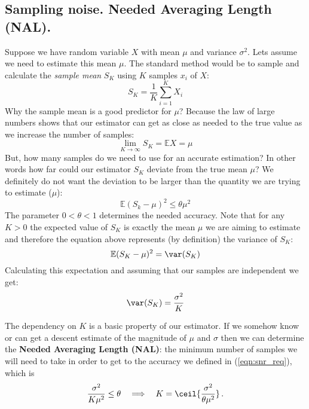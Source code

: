 \documentclass{article} %
\begin{document}
\subsection{Sampling noise. Needed Averaging Length (NAL).}
\label{sec:sampleing_noise}
Suppose we have random variable $X$ with mean $\mu$ and variance $\sigma^2$. 
Lets assume we need to estimate this mean $\mu$. The standard method would be to sample and calculate the {\it sample mean} $S_K$ using $K$ samples $x_i$ of $X$:
\begin{equation}
S_K = \frac{1}{K}\sum_{i=1}^K X_i
\label{eqn:estimate}
\end{equation}
Why the sample mean is a good predictor for $\mu$? Because the law of large numbers shows that  our estimator can get as close as needed to the true value as we increase the number of samples:
\begin{equation}
\lim_{K \rightarrow \infty} S_K = \mathbb{E} X = \mu
\end{equation}
But, how many samples do we need to use for an accurate estimation?  In other words how far could our estimator $S_K$ deviate from the true mean $\mu$? We definitely do not want the deviation to be larger than the quantity we are trying to estimate ($\mu$): 
\begin{equation}
\mathbb{E}(S_k - \mu)^2 \le \theta \mu^2
\label{eqn:snr_req}
\end{equation}
The parameter $0 < \theta < 1$ determines the needed accuracy. Note that for any $K>0$ the expected value of $S_K$ is exactly the mean $\mu$ we are aiming to estimate and therefore the equation above represents (by definition) the variance of $S_K$:
\begin{equation}
\mathbb{E}(S_K - \mu)^2 = \var(S_K) 
\end{equation}
Calculating this expectation and assuming that our samples are independent we get:
\begin{equation}
\var(S_K) = \frac{\sigma^2}{K}
\end{equation}

The dependency on $K$ is a basic property of our estimator. If we somehow know or can get a descent estimate of the magnitude of $\mu$ and $\sigma$ then we can determine the \textbf{Needed Averaging Length (NAL)}: the minimum number of samples we will need to take in order to get to the accuracy we defined in (\ref{eqn:snr_req}), which is
\begin{equation}
\frac{\sigma^2}{K \mu^2} \le \theta \quad \Longrightarrow \quad K = 
\ceil{\frac{\sigma^2}{\theta \mu^2}}\,.
\label{eqn:snri}
\end{equation}
\end{document}

